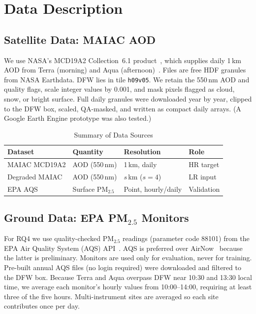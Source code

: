 \documentclass[conference]{IEEEtran}
\begin{document}
\section{Data Description}
\subsection{Satellite Data: MAIAC AOD}
We use NASA's MCD19A2 Collection~6.1 product~\cite{mcd19a2}, which supplies daily 1\,km AOD from Terra (morning) and Aqua (afternoon)~\cite{lyapustin2018maiac}. Files are free HDF granules from NASA Earthdata. DFW lies in tile \texttt{h09v05}. We retain the 550\,nm AOD and quality flags, scale integer values by 0.001, and mask pixels flagged as cloud, snow, or bright surface. Full daily granules were downloaded year by year, clipped to the DFW box, scaled, QA-masked, and written as compact daily arrays. (A Google Earth Engine prototype was also tested.)
\begin{table}[H]
\caption{Summary of Data Sources}
\label{tab:data}
\centering
\footnotesize
\setlength{\tabcolsep}{3pt}
\renewcommand{\arraystretch}{1.0}
\begin{tabularx}{\columnwidth}{@{}l l l >{\raggedright\arraybackslash}X@{}}
\toprule
\textbf{Dataset} & \textbf{Quantity} & \textbf{Resolution} & \textbf{Role} \\
\midrule
MAIAC MCD19A2 & AOD (550\,nm) & 1\,km, daily & HR target \\
Degraded MAIAC & AOD (550\,nm) & \(s\)\,km (\(s{=}4\)) & LR input \\
EPA AQS & Surface PM$_{2.5}$ & Point, hourly/daily & Validation \\
\bottomrule
\end{tabularx}
\end{table}
\subsection{Ground Data: EPA PM$_{2.5}$ Monitors}
For RQ4 we use quality-checked PM$_{2.5}$ readings (parameter code 88101) from the EPA Air Quality System (AQS) API~\cite{epa_aqs}. AQS is preferred over AirNow~\cite{epa_airnow} because the latter is preliminary. Monitors are used only for evaluation, never for training. Pre-built annual AQS files (no login required) were downloaded and filtered to the DFW box. Because Terra and Aqua overpass DFW near 10:30 and 13:30 local time, we average each monitor's hourly values from 10:00--14:00, requiring at least three of the five hours. Multi-instrument sites are averaged so each site contributes once per day.
\end{document}
